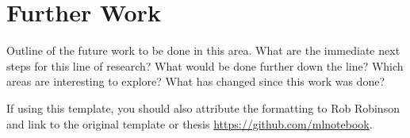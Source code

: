 \section{Further Work}
\label{sec:6-further_work}
\glsresetall

Outline of the future work to be done in this area. What are the immediate next steps for this line of research? What would be done further down the line? Which areas are interesting to explore? What has changed since this work was done?

If using this template, you should also attribute the formatting to Rob Robinson \parencite{robinson2020thesis} and link to the original template or thesis \url{https://github.com/mlnotebook}.

